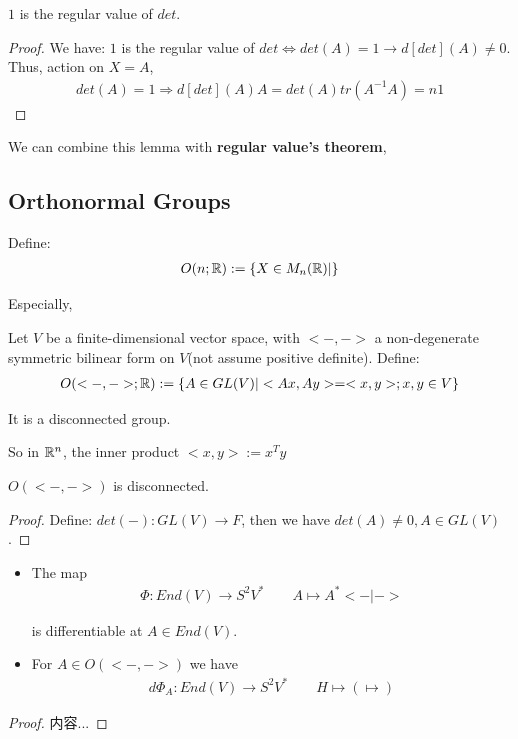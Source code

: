 \documentclass[Total.tex]{subfiles}
\begin{document}
			\begin{corollary}
				$1$ is the regular value of $det$. 
			\end{corollary}
			\begin{proof}
				We have: $1$ is the regular value of $det\Leftrightarrow det(A)=1\rightarrow d[det](A)\not=0$. Thus, action on $X=A$,
				\begin{gather*}
					det(A)=1\Rightarrow d[det](A)A=det(A)tr(A^{-1}A)=n1
				\end{gather*}
			\end{proof}
			
			We can combine this lemma with \textbf{regular value's theorem}, 
			
			\subsection{Orthonormal Groups}
			\begin{Def}
				Define:
				\begin{gather*}
					O(n;\mathbb{R}):=\{X\in M_n(\mathbb{R})|\}
				\end{gather*}
			\end{Def}
			
			Especially, 
			\begin{Def}
				Let $V$ be a finite-dimensional vector space, with $<-,->$ a non-degenerate symmetric bilinear form on $V$(not assume positive definite). Define:
				\begin{gather*}
					O(<-,->;\mathbb{R}):=\{A\in GL(V)|<Ax,Ay>=<x,y>;x,y\in V\}
				\end{gather*}
				
				It is a disconnected group.
			\end{Def}
			
			So in $\mathbb{R}^n$, the inner product $<x,y>:=x^Ty$
			
			\begin{lemma}
				$O(<-,->)$ is disconnected.
			\end{lemma}
			\begin{proof}
				Define: $det(-):GL(V)\rightarrow F$, then we have $det(A)\not=0,A\in GL(V)$.
			\end{proof}
			
			\begin{lemma}
				\begin{itemize}
					\item The map
					\begin{gather*}
						\Phi:End(V)\rightarrow S^2V^*\qquad A\mapsto A^*<-|->
					\end{gather*}
					
					is differentiable at $A\in End(V)$. 
					\item For $A\in O(<-,->)$ we have
					\begin{gather*}
						d\Phi_A:End(V)\rightarrow S^2 V^*\qquad H\mapsto (\mapsto )
					\end{gather*}
				\end{itemize}
			\end{lemma}
			\begin{proof}
				内容...
			\end{proof}
			
\end{document}
